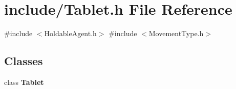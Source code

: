 \section{include/\+Tablet.h File Reference}
\label{_tablet_8h}
{\ttfamily \#include $<$Holdable\+Agent.\+h$>$}\newline
{\ttfamily \#include $<$Movement\+Type.\+h$>$}\newline
\subsection*{Classes}
\begin{DoxyCompactItemize}
\item 
class \textbf{ Tablet}
\end{DoxyCompactItemize}
